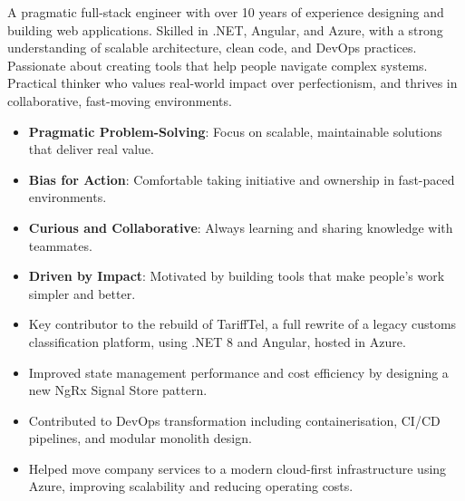 \documentclass[10pt,a4paper,ragged2e,withhyper]{altacv}
\begin{document}
\makecvheader

\begin{paracol}{2}

A pragmatic full-stack engineer with over 10 years of experience designing and building web applications. Skilled in .NET, Angular, and Azure, with a strong understanding of scalable architecture, clean code, and DevOps practices. Passionate about creating tools that help people navigate complex systems. Practical thinker who values real-world impact over perfectionism, and thrives in collaborative, fast-moving environments.





\begin{itemize}
  \item \textbf{Pragmatic Problem-Solving}: Focus on scalable, maintainable solutions that deliver real value.
  \item \textbf{Bias for Action}: Comfortable taking initiative and ownership in fast-paced environments.
  \item \textbf{Curious and Collaborative}: Always learning and sharing knowledge with teammates.
  \item \textbf{Driven by Impact}: Motivated by building tools that make people's work simpler and better.
\end{itemize}

\begin{itemize}
  \item Key contributor to the rebuild of TariffTel, a full rewrite of a legacy customs classification platform, using .NET 8 and Angular, hosted in Azure.
  \item Improved state management performance and cost efficiency by designing a new NgRx Signal Store pattern.
  \item Contributed to DevOps transformation including containerisation, CI/CD pipelines, and modular monolith design.
  \item Helped move company services to a modern cloud-first infrastructure using Azure, improving scalability and reducing operating costs.
\end{itemize}


\end{paracol}
\end{document}
